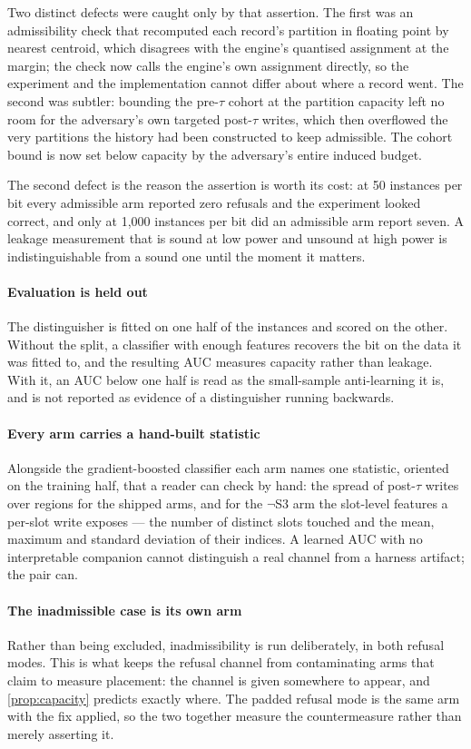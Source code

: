 \documentclass[10pt,journal,compsoc]{IEEEtran}
\begin{document}
Two distinct defects were caught only by that assertion. The first was an admissibility check that
recomputed each record's partition in floating point by nearest centroid, which disagrees with the
engine's quantised assignment at the margin; the check now calls the engine's own assignment
directly, so the experiment and the implementation cannot differ about where a record went. The
second was subtler: bounding the pre-$\tau$ cohort at the partition capacity left no room for the
adversary's own targeted post-$\tau$ writes, which then overflowed the very partitions the history
had been constructed to keep admissible. The cohort bound is now set below capacity by the
adversary's entire induced budget.

The second defect is the reason the assertion is worth its cost: at 50 instances per bit every
admissible arm reported zero refusals and the experiment looked correct, and only at 1{,}000
instances per bit did an admissible arm report seven. A leakage measurement that is sound at low
power and unsound at high power is indistinguishable from a sound one until the moment it matters.

\paragraph{Evaluation is held out} The distinguisher is fitted on one half of the instances and
scored on the other. Without the split, a classifier with enough features recovers the bit on the
data it was fitted to, and the resulting AUC measures capacity rather than leakage. With it, an AUC
below one half is read as the small-sample anti-learning it is, and is not reported as evidence of a
distinguisher running backwards.

\paragraph{Every arm carries a hand-built statistic} Alongside the gradient-boosted classifier each
arm names one statistic, oriented on the training half, that a reader can check by hand: the spread
of post-$\tau$ writes over regions for the shipped arms, and for the $\lnot$S3 arm the slot-level
features a per-slot write exposes --- the number of distinct slots touched and the mean, maximum and
standard deviation of their indices. A learned AUC with no interpretable companion cannot
distinguish a real channel from a harness artifact; the pair can.

\paragraph{The inadmissible case is its own arm} Rather than being excluded, inadmissibility is run
deliberately, in both refusal modes. This is what keeps the refusal channel from contaminating arms
that claim to measure placement: the channel is given somewhere to appear, and \cref{prop:capacity}
predicts exactly where. The padded refusal mode is the same arm with the fix applied, so the two
together measure the countermeasure rather than merely asserting it.
\end{document}

